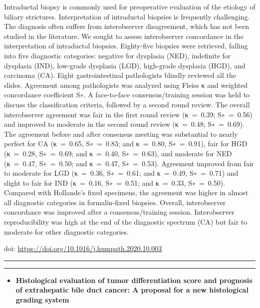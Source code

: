 \documentclass[
]{article}
\providecommand{\tightlist}{%
  \setlength{\itemsep}{0pt}\setlength{\parskip}{0pt}}
\begin{document}
Intraductal biopsy is commonly used for preoperative evaluation of the
etiology of biliary strictures. Interpretation of intraductal biopsies
is frequently challenging. The diagnosis often suffers from
interobserver disagreement, which has not been studied in the
literature. We sought to assess interobserver concordance in the
interpretation of intraductal biopsies. Eighty-five biopsies were
retrieved, falling into five diagnostic categories: negative for
dysplasia (NED), indefinite for dysplasia (IND), low-grade dysplasia
(LGD), high-grade dysplasia (HGD), and carcinoma (CA). Eight
gastrointestinal pathologists blindly reviewed all the slides. Agreement
among pathologists was analyzed using Fleiss κ and weighted concordance
coefficient S∗. A face-to-face consensus/training session was held to
discuss the classification criteria, followed by a second round review.
The overall interobserver agreement was fair in the first round review
(κ~=~0.39; S∗~=~0.56) and improved to moderate in the second round
review (κ~=~0.48; S∗~=~0.69). The agreement before and after consensus
meeting was substantial to nearly perfect for CA (κ~=~0.65, S∗~=~0.83;
and κ~=~0.80, S∗~=~0.91), fair for HGD (κ~=~0.28, S∗~=~0.69; and
κ~=~0.40, S∗~=~0.63), and moderate for NED (κ~=~0.47, S∗~=~0.50; and
κ~=~0.47, S∗~=~0.53). Agreement improved from fair to moderate for LGD
(κ~=~0.36, S∗~=~0.61; and κ~=~0.49, S∗~=~0.71) and slight to fair for
IND (κ~=~0.16, S∗~=~0.51; and κ~=~0.33, S∗~=~0.50). Compared with
Hollande's fixed specimens, the agreement was higher in almost all
diagnostic categories in formalin-fixed biopsies. Overall, interobserver
concordance was improved after a consensus/training session.
Interobserver reproducibility was high at the end of the diagnostic
spectrum (CA) but fair to moderate for other diagnostic categories.

doi: \url{https://doi.org/10.1016/j.humpath.2020.10.003}

\begin{center}\rule{0.5\linewidth}{0.5pt}\end{center}

\begin{center}\rule{0.5\linewidth}{0.5pt}\end{center}

\begin{itemize}
\tightlist
\item
  \textbf{Histological evaluation of tumor differentiation score and
  prognosis of extrahepatic bile duct cancer: A proposal for a new
  histological grading system}
\end{itemize}
\end{document}
